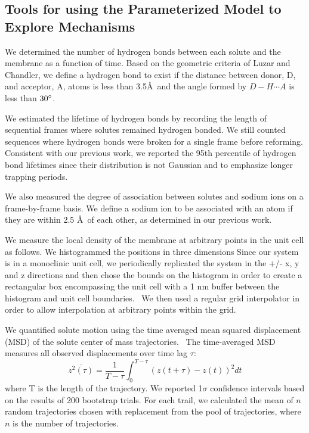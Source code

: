 \documentclass[journal=jpcbfk,manuscript=article]{achemso}
\begin{document}
  \subsection{Tools for using the Parameterized Model to Explore Mechanisms}\label{method:interactions}
  
  We determined the number of hydrogen bonds between each solute and the membrane
  as a function of time. Based on the geometric criteria of Luzar and Chandler, we 
  define a hydrogen bond to exist if the distance between donor, D, and acceptor, 
  A, atoms is less than 3.5\AA~and the angle formed by $D-H \cdots A$ is less than 
  $30\degree$.~\cite{luzar_effect_1996}
  
  We estimated the lifetime of hydrogen bonds by recording the length of 
  sequential frames where solutes remained hydrogen bonded. We still counted sequences
  where hydrogen bonds were broken for a single frame before reforming. Consistent
  with our previous work, we reported the 95th percentile of hydrogen bond lifetimes
  since their distribution is not Gaussian and to emphasize longer trapping periods.~\cite{coscia_chemically_2019}
  
  We also measured the degree of association between solutes and sodium ions on a
  frame-by-frame basis. We define a sodium ion to be associated with an atom if they
  are within 2.5 \AA~of each other, as determined in our previous work.~\cite{coscia_chemically_2019}
  
  We measure the local density of the membrane at arbitrary
  points in the unit cell as follows. We histogrammed the positions in three dimensions
  Since our system is in a monoclinic unit cell, we periodically replicated
  the system in the +/- x, y and z directions and then chose the bounds on the
  histogram in order to create a rectangular box encompassing the unit cell with
  a 1 nm buffer between the histogram and unit cell boundaries.~\cite{van_der_walt_numpy_2011} We then used a regular
  grid interpolator in order to allow interpolation at arbitrary points within the grid.~\cite{virtanen_scipy_2020} 
  
  We quantified solute motion using the time averaged mean squared displacement (MSD)
  of the solute center of mass trajectories.~\cite{meroz_toolbox_2015} The time-averaged MSD measures all observed
  displacements over time lag $\tau$:
  \begin{equation}
  	\overline{z^2(\tau)} = \dfrac{1}{T - \tau}\int_{0}^{T - \tau} (z(t + \tau) - z(t))^2 dt
  \label{eqn:tamsd}
  \end{equation}
  where T is the length of the trajectory. We reported 1$\sigma$ confidence intervals 
  based on the results of 200 bootstrap trials. For each trail, we calculated the mean of 
  $n$ random trajectories chosen with replacement from the pool of trajectories, where 
  $n$ is the number of trajectories.
\end{document}
